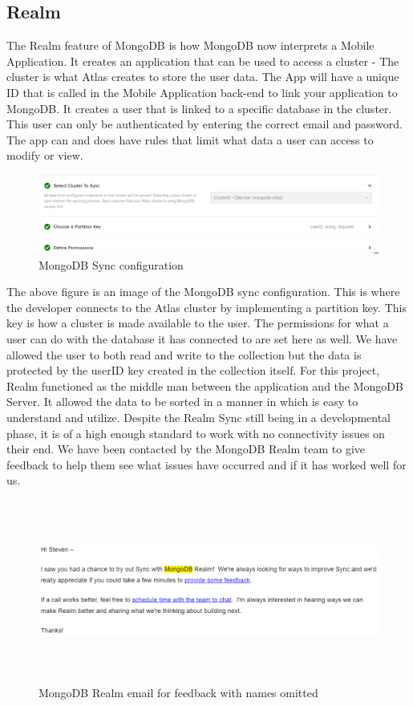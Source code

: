 \subsection{Realm}
The Realm feature of MongoDB is how MongoDB now interprets a Mobile Application. It creates an application that can be used to access a cluster - The cluster is what Atlas creates to store the user data.
\newline
The App will have a unique ID that is called in the Mobile Application back-end to link your application to MongoDB. It creates a user that is linked to a specific database in the cluster. This user can only be authenticated by entering the correct email and password. The app can and does have rules that limit what data a user can access to modify or view.
\begin{figure}[H]
    \centering
    \includegraphics[width=15cm]{img/syncSetup.PNG}
    \caption{MongoDB Sync configuration}
    \label{fig:MongoDB Sync configuration}
\end{figure}
The above figure is an image of the MongoDB sync configuration. This is where the developer connects to the Atlas cluster by implementing a partition key. This key is how a cluster is made available to the user. The permissions for what a user can do with the database it has connected to are set here as well. We have allowed the user to both read and write to the collection but the data is protected by the userID key created in the collection itself.\newline
For this project, Realm functioned as the middle man between the application and the MongoDB Server. It allowed the data to be sorted in a manner in which is easy to understand and utilize. Despite the Realm Sync still being in a developmental phase, it is of a high enough standard to work with no connectivity issues on their end. \newline
We have been contacted by the MongoDB Realm team to give feedback to help them see what issues have occurred and if it has worked well for us.
\begin{figure}[H]
    \centering
    \includegraphics[width=15cm, height = 6cm]{img/feedback_email.PNG}
    \caption{MongoDB Realm email for feedback with names omitted}
    \label{fig:MongoDB Realm contact}
\end{figure}
